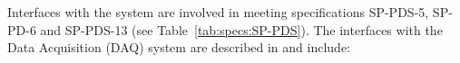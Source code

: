 





Interfaces with the  system are involved in meeting specifications SP-PDS-5, SP-PD-6 and SP-PDS-13 (see Table~\ref{tab:specs:SP-PDS}).  The  interfaces with the Data Acquisition (DAQ) system are described in  and include:

